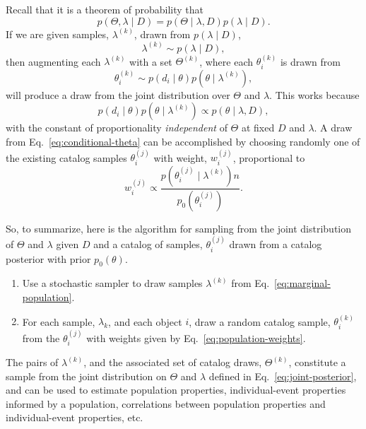 \documentclass[modern]{aastex63}
\begin{document}
Recall that it is a theorem of probability that
%
\begin{equation}
  p\left( \Theta, \lambda \mid D \right) = p\left( \Theta \mid \lambda, D \right) p\left( \lambda \mid D \right).
\end{equation}
If we are given samples, $\lambda^{(k)}$, drawn from $p\left( \lambda \mid D \right)$,
%
\begin{equation}
  \lambda^{(k)} \sim p\left( \lambda \mid D \right),
\end{equation}
%
then augmenting each $\lambda^{(k)}$ with a set $\Theta^{(k)}$, where each $\theta_i^{(k)}$
is drawn from
%
\begin{equation}
  \label{eq:conditional-theta}
  \theta_i^{(k)} \sim p\left( d_i \mid \theta \right) p\left( \theta \mid \lambda^{(k)} \right),
\end{equation}
%
will produce a draw from the joint distribution over $\Theta$ and $\lambda$.
This works because
%
\begin{equation}
  p\left( d_i \mid \theta \right) p\left( \theta \mid \lambda^{(k)} \right) \propto p\left( \theta \mid \lambda, D \right),
\end{equation}
%
with the constant of proportionality \emph{independent} of $\Theta$ at fixed $D$
and $\lambda$.  A draw from Eq.\ \eqref{eq:conditional-theta} can be
accomplished by choosing randomly one of the existing catalog samples
$\theta_i^{(j)}$ with weight, $w_i^{(j)}$, proportional to \citep{Hogg2010}
%
\begin{equation}
  \label{eq:population-weights}
  w_i^{(j)} \propto \frac{p\left( \theta_i^{(j)} \mid \lambda^{(k)} \right)n}{p_0 \left( \theta_i^{(j)} \right)}.
\end{equation}

So, to summarize, here is the algorithm for sampling from the joint distribution
of $\Theta$ and $\lambda$ given $D$ and a catalog of samples, $\theta_i^{(j)}$
drawn from a catalog posterior with prior $p_0\left(\theta\right)$.
\begin{enumerate}
%
  \item Use a stochastic sampler to draw samples $\lambda^{(k)}$ from Eq.\ \eqref{eq:marginal-population}.
%
  \item For each sample, $\lambda_k$, and each object $i$, draw a random catalog
  sample, $\theta_i^{(k)}$ from the $\theta_i^{(j)}$ with weights given by Eq.\
  \eqref{eq:population-weights}.
%
\end{enumerate}

The pairs of $\lambda^{(k)}$, and the associated set of catalog draws,
$\Theta^{(k)}$, constitute a sample from the joint distribution on $\Theta$ and
$\lambda$ defined in Eq.\ \eqref{eq:joint-posterior}, and can be used to
estimate population properties, individual-event properties informed by a
population, correlations between population properties and individual-event
properties, etc.


\end{document}
